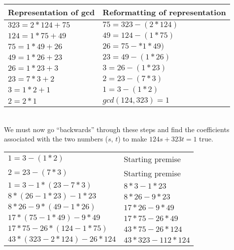 \documentclass[11pt]{article}
\begin{document}
\begin{enumerate}
\begin{enumerate}[(a)]
\begin{tabular}{ll}
				Representation of gcd & Reformatting of representation \\

				\hline

				$323 = 2 * 124 + 75$ & $75 = 323 - (2 * 124)$\\

				$124 = 1 * 75 +49$ & $49 = 124 - (1 * 75)$\\

				$75 = 1 * 49 + 26$ & $26 = 75 - *1*49)$\\

				$49 = 1 * 26 + 23$ & $23 = 49 - (1 * 26)$\\

				$26 = 1 * 23 + 3$ & $3 = 26 - (1 * 23)$\\

				$23 = 7 * 3 + 2$ & $2 = 23 - (7 * 3)$\\

				$3 = 1 * 2 + 1$ & $1 = 3 - (1 * 2)$\\

				$2 = 2 * 1$ & $gcd(124, 323) = 1$ \\

			\end{tabular} \\

			We must now go ``backwards'' through these steps and find the coefficients associated with the two numbers ($s$, $t$)
			to make $124s + 323t = 1$ true.

			\begin{tabular}{ll}
				$1 = 3 - (1 * 2)$ & Starting premise\\

				$2 = 23 - (7 * 3)$ & Starting premise\\

				$1 = 3 - 1 * (23 - 7 * 3)$ & $8 * 3 - 1 * 23$ \\

				$8 * (26 - 1 * 23) - 1 * 23$ & $8 * 26 - 9 * 23$ \\

				$8 * 26 - 9 * (49 - 1 * 26)$ & $17 * 26 - 9 * 49$ \\

				$17 * (75 - 1 * 49) - 9 * 49$ & $17 * 75 - 26 * 49$ \\

				$17 * 75 - 26 * (124 - 1 * 75)$ & $43 * 75 - 26 * 124$ \\

				$43 * (323 - 2 * 124) - 26 * 124$ & $43 * 323 - 112 * 124$ \\


\end{tabular}
\end{enumerate}
\end{enumerate}
\end{document}
